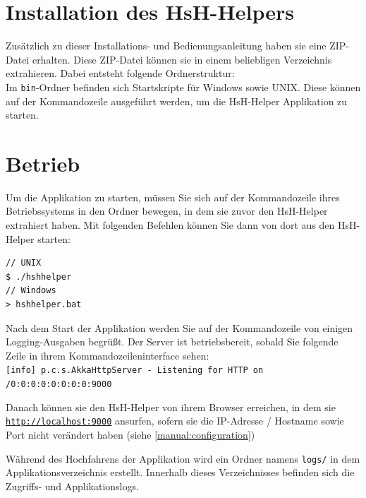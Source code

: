 \documentclass[12pt,DIV14,BCOR10mm,a4paper,parskip=half-,headsepline,headinclude,english,ngerman,bibliography=totocnumbered]{scrreprt}
\begin{document}
\vspace*{-3cm}

\tableofcontents  %

\chapter{Installation des HsH-Helpers}

Zusätzlich zu dieser Installations- und Bedienungsanleitung haben sie eine ZIP-Datei erhalten.
Diese ZIP-Datei können sie in einem beliebligen Verzeichnis extrahieren.
Dabei entsteht folgende Ordnerstruktur: \\
\bigskip
Im \texttt{bin}-Ordner befinden sich Startskripte für Windows sowie UNIX.
Diese können auf der Kommandozeile ausgeführt werden, um die HsH-Helper Applikation zu starten.

\chapter{Betrieb}

Um die Applikation zu starten, müssen Sie sich auf der Kommandozeile ihres Betriebssystems in den Ordner bewegen, in dem sie zuvor den HsH-Helper extrahiert haben.
Mit folgenden Befehlen können Sie dann von dort aus den HsH-Helper starten:

\begin{lstlisting}[label=server-operation, caption={Kommandozeilenbefehle zum Ausführen der Applikation}, captionpos=b]
// UNIX
$ ./hshhelper
// Windows
> hshhelper.bat
\end{lstlisting}

Nach dem Start der Applikation werden Sie auf der Kommandozeile von einigen Logging-Ausgaben begrüßt.
Der Server ist betriebsbereit, sobald Sie folgende Zeile in ihrem Kommandozeileninterface sehen: \\
\texttt{[info] p.c.s.AkkaHttpServer - Listening for HTTP on /0:0:0:0:0:0:0:0:9000}

Danach können sie den HsH-Helper von ihrem Browser erreichen, in dem sie \texttt{\url{http://localhost:9000}} ansurfen, sofern sie die IP-Adresse / Hostname sowie Port nicht verändert haben (siehe \autoref{manual:configuration})

Während des Hochfahrens der Applikation wird ein Ordner namens \texttt{logs/} in dem Applikationsverzeichnis erstellt.
Innerhalb dieses Verzeichnisses befinden sich die Zugriffs- und Applikationslogs.
\end{document}
